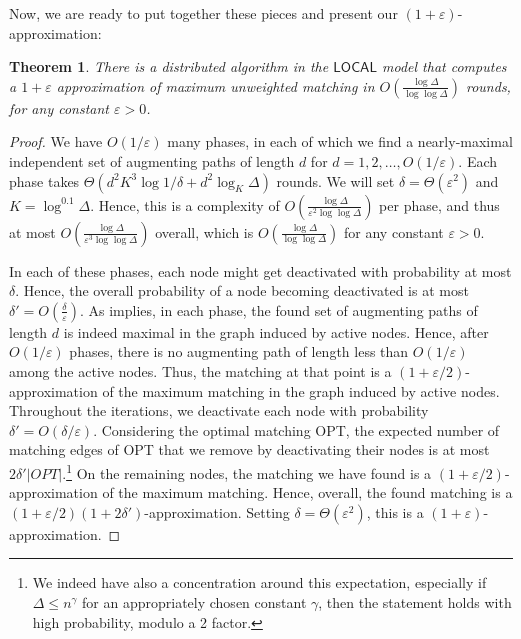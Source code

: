 \documentclass[11pt]{article}
\newtheorem{theorem}{Theorem}[section]
\newcommand{\eps}{\varepsilon}
\begin{document}
Now, we are ready to put together these pieces and present our $(1+\eps)$-approximation:
\begin{theorem} \label{thm:MCM1LOCAL} There is a distributed algorithm in the $\mathsf{LOCAL}$ model that computes a $1+\eps$ approximation of maximum unweighted matching in $O(\frac{\log\Delta} {\log\log \Delta})$ rounds, for any constant $\eps>0$.
\end{theorem}
\begin{proof}We have $O(1/\eps)$ many phases, in each of which we find a nearly-maximal independent set of augmenting paths of length $d$ for $d=1, 2, \dots, O(1/\eps)$. Each phase takes $\Theta(d^2K^3\log 1/\delta + d^2\log_{K}{\Delta})$ rounds. We will set $\delta = \Theta(\eps^2)$ and $K=\log^{0.1} \Delta$. Hence, this is a complexity of $O(\frac{\log\Delta} {\eps^2\log\log \Delta})$ per phase, and thus at most $O(\frac{\log\Delta} {\eps^3\log\log \Delta})$ overall, which is $O(\frac{\log\Delta} {\log\log \Delta})$ for any constant $\eps>0$.

 In each of these phases, each node might get deactivated with probability at most $\delta$. Hence, the overall probability of a node becoming deactivated is at most $\delta'=O(\frac{\delta}{\eps})$. As  implies, in each phase, the found set of augmenting paths of length $d$ is indeed maximal in the graph induced by active nodes. Hence, after $O(1/\eps)$ phases, there is no augmenting path of length less than $O(1/\eps)$ among the active nodes. Thus, the matching at that point is a $(1+\eps/2)$-approximation of the maximum matching in the graph induced by active nodes.
Throughout the iterations, we deactivate each node with probability $\delta'=O(\delta/\eps)$. Considering the optimal matching OPT, the expected number of matching edges of OPT that we remove by deactivating their nodes is at most $2\delta'|OPT|$.\footnote{We indeed have also a concentration around this expectation, especially if $\Delta\leq n^{\gamma}$ for an appropriately chosen constant $\gamma$, then the statement holds with high probability, modulo a 2 factor.} On the remaining nodes, the matching we have found is a $(1+\eps/2)$-approximation of the maximum matching. Hence, overall, the found matching is a $(1+\eps/2)(1+2\delta')$-approximation. Setting $\delta = \Theta(\eps^2)$, this is a $(1+\eps)$-approximation.
\end{proof}
\end{document}
